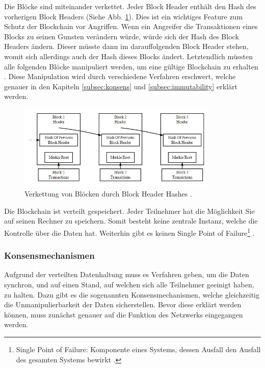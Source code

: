 Die Blöcke sind miteinander verkettet. Jeder Block Header enthält den Hash  des vorherigen Block Headers (Siehe Abb. \ref{fig:block-chain}). Dies ist ein wichtiges Feature zum Schutz der Blockchain vor Angriffen. Wenn ein Angreifer die Transaktionen eines Blocks zu seinen Gunsten verändern würde, würde sich der Hash des Block Headers ändern. Dieser müsste dann im darauffolgenden Block Header stehen, womit sich allerdings auch der Hash dieses Blocks ändert. Letztendlich müssten alle folgenden Blöcke manipuliert werden, um eine gültige Blockchain zu erhalten \cite{NakamotoBitcoinPeertoPeerElectronic2008}. Diese Manipulation wird durch verschiedene Verfahren erschwert, welche genauer in den Kapiteln \ref{subsec:konsens} und \ref{subsec:immutability} erklärt werden.

\begin{figure}[!htbp]
  \centering
	\includegraphics[width=0.85\textwidth,angle=0]{images/block-chain}
 	\caption{Verkettung von Blöcken durch Block Header Hashes \cite{RosicWhatHashingHood2017}.}
	\label{fig:block-chain}
\end{figure}

Die Blockchain ist verteilt gespeichert. Jeder Teilnehmer hat die Möglichkeit Sie auf seinen Rechner zu speichern. Somit besteht keine zentrale Instanz, welche die Kontrolle über die Daten hat. Weiterhin gibt es keinen Single Point of Failure\footnote{Single Point of Failure: Komponente eines Systems, dessen Ausfall den Ausfall des gesamten Systems bewirkt \cite{AntonopoulosMasteringbitcoin2015}.} \cite{CrosbyBlockChainTechnologyBitcoin2016}.

\label{subsec:konsens}
\subsubsection{Konsensmechanismen}
Aufgrund der verteilten Datenhaltung muss es Verfahren geben, um die Daten synchron, und auf einen Stand, auf welchen sich alle Teilnehmer geeinigt haben, zu halten. Dazu gibt es die sogenannten Konsensmechanismen, welche gleichzeitig die Unmanipulierbarkeit der Daten sicherstellen. Bevor diese erklärt werden können, muss zunächst genauer auf die Funktion des Netzwerks eingegangen werden.

